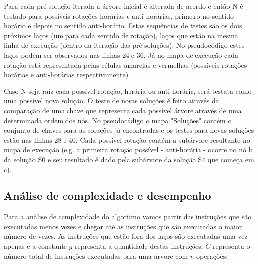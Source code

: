Para cada pré-solução iterada a árvore inicial é alterada de acordo e então N é testado para possíveis rotações horárias e anti-horárias, primeiro no sentido horário e depois no sentido anti-horário. Estas sequências de testes são os dois próximos laços (um para cada sentido de rotação), laços que estão na mesma linha de execução (dentro da iteração das pré-soluções). No pseudocódigo estes laços podem ser observados nas linhas 24 e 36. Já no mapa de execução cada rotação está representada pelas células amarelas e vermelhas (possíveis rotações horárias e anti-horárias respectivamente).

Caso N seja raíz cada possível rotação, horária ou anti-horária, será testata como uma possível nova solução. O teste de novas soluções é feito através da comparação de uma chave que representa cada possível árvore através de uma determinada ordem dos nós. No pseudocódigo o mapa "Soluções" contém o conjunto de chaves para as soluções já encontradas e os testes para novas soluções estão nas linhas 28 e 40. Cada possível rotação contém a subárvore resultante no mapa de execução (e.g. a primeira rotação possível - anti-horária - ocorre no nó b da solução S0 e seu resultado é dado pela subárvore da solução S4 que começa em c).

	
	

\subsection{Análise de complexidade e desempenho}
Para a análise de complexidade do algoritmo vamos partir das instruções que são executadas menos vezes e chegar até as instruções que são executadas o maior número de vezes. As instruções que estão fora dos laços são executadas uma vez apenas e a constante $g$ representa a quantidade destas instruções. $C$ representa o número total de instruções executadas para uma árvore com $n$ operações:

